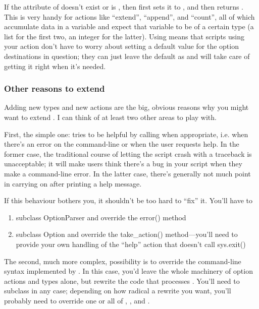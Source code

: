 If the  attribute of  doesn't exist or is
, then  first sets it to , and
then returns . This is very handy for actions like
``extend'', ``append'', and ``count'', all of which accumulate data in
a variable and expect that variable to be of a certain type (a list
for the first two, an integer for the latter).  Using
 means that scripts using your action don't
have to worry about setting a default value for the option
destinations in question; they can just leave the default as  and
 will take care of getting it right when it's
needed.

\subsubsection{Other reasons to extend \label{optparse-extending-other-reasons}}

Adding new types and new actions are the big, obvious reasons why you
might want to extend .  I can think of at least two
other areas to play with.

First, the simple one:  tries to be helpful by
calling  when appropriate, i.e. when there's an
error on the command-line or when the user requests help.  In the
former case, the traditional course of letting the script crash with a
traceback is unacceptable; it will make users think there's a bug in
your script when they make a command-line error.  In the latter case,
there's generally not much point in carrying on after printing a help
message.

If this behaviour bothers you, it shouldn't be too hard to ``fix'' it.
You'll have to

\begin{enumerate}
\item subclass OptionParser and override the error() method
\item subclass Option and override the take_action() method---you'll
      need to provide your own handling of the ``help'' action that
      doesn't call sys.exit()
\end{enumerate}

The second, much more complex, possibility is to override the
command-line syntax implemented by .  In this case,
you'd leave the whole machinery of option actions and types alone, but
rewrite the code that processes .  You'll need to
subclass  in any case; depending on how radical a
rewrite you want, you'll probably need to override one or all of
, , and
.

